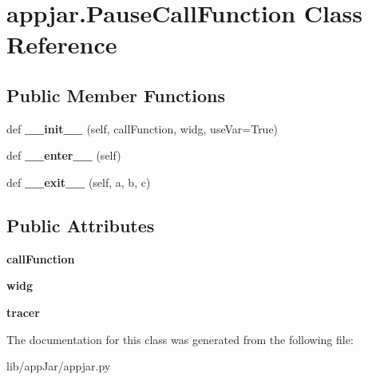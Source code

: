 \hypertarget{classappjar_1_1_pause_call_function}{}\section{appjar.\+Pause\+Call\+Function Class Reference}
\label{classappjar_1_1_pause_call_function}
\subsection*{Public Member Functions}
\begin{DoxyCompactItemize}
\item 
\mbox{\label{classappjar_1_1_pause_call_function_afbe4152eec2bf7b7240ed9f63f4283d9}} 
def {\bfseries \+\_\+\+\_\+init\+\_\+\+\_\+} (self, call\+Function, widg, use\+Var=True)
\item 
\mbox{\label{classappjar_1_1_pause_call_function_a5fddfc7e683ff01c2387f88b463b1021}} 
def {\bfseries \+\_\+\+\_\+enter\+\_\+\+\_\+} (self)
\item 
\mbox{\label{classappjar_1_1_pause_call_function_a140ac6a8121ba9db2c23c7d1fc8d1435}} 
def {\bfseries \+\_\+\+\_\+exit\+\_\+\+\_\+} (self, a, b, c)
\end{DoxyCompactItemize}
\subsection*{Public Attributes}
\begin{DoxyCompactItemize}
\item 
\mbox{\label{classappjar_1_1_pause_call_function_a5fb5c6f5776f10ef0e7a63cb66bf3791}} 
{\bfseries call\+Function}
\item 
\mbox{\label{classappjar_1_1_pause_call_function_a6ca8b3e0ae8bd20c5182b1a2633b4d52}} 
{\bfseries widg}
\item 
\mbox{\label{classappjar_1_1_pause_call_function_a800148f4f68e353f9d7650b3125b3de1}} 
{\bfseries tracer}
\end{DoxyCompactItemize}


The documentation for this class was generated from the following file\+:\begin{DoxyCompactItemize}
\item 
lib/app\+Jar/appjar.\+py\end{DoxyCompactItemize}
